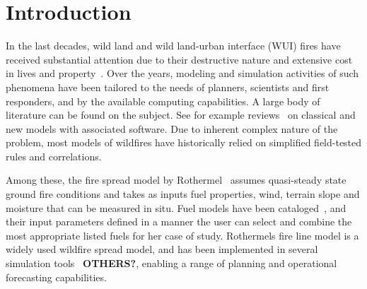 \documentclass[journal,article,atmosphere,submit,moreauthors,pdftex]{Definitions/mdpi}
\begin{document}
\section{Introduction}

In the last decades, wild land and wild land-urban interface (WUI) fires have received substantial attention due to their destructive nature and extensive cost in lives and property~\cite{thomas_2017,mcdermott_2019,boghani_2019,richards_2020}. Over the years, modeling and simulation activities of such phenomena have been tailored to the needs of planners, scientists and first responders, and by the available computing capabilities.
A large body of literature can be found on the subject. See for example reviews~\cite{Papadopoulos_2011,Bakhshaii_2019,mcdermott_2019} on classical and new models with associated software. Due to inherent complex nature of the problem, most models of wildfires have historically relied on simplified field-tested rules and correlations.

Among these, the fire spread model by Rothermel~\cite{Rothermel:1972} assumes quasi-steady state ground fire conditions and takes as inputs fuel properties, wind, terrain slope and moisture that can be measured in situ.
Fuel models have been cataloged~\cite{Anderson:1982}, and their input parameters defined in a manner the user can select and combine the most appropriate listed fuels for her case of study. Rothermels fire line model is a widely used wildfire spread model, and has been implemented in several simulation tools~\cite{Finney:FARSITE,Bova:IJWF2015,mcgratta_2013} \textbf{OTHERS?}, enabling a range of planning and operational forecasting capabilities.
\end{document}
